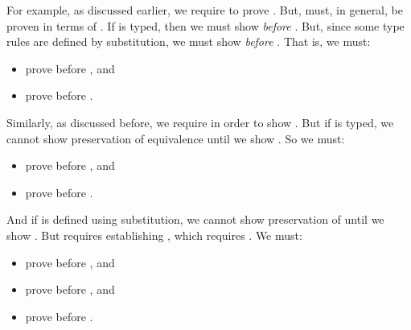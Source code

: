 For example, as discussed earlier, we require
 to prove .
But,  must, in general, be proven in terms of
.
If  is typed, then we must show \emph{
before }.
But, since some type rules are defined by substitution, we must show
\emph{ before }.
That is, we must:
\begin{itemize}
  \item prove  before , and
  \item prove  before .
\end{itemize}
Similarly, as discussed before, we require  in
order to show .
But if  is typed, we cannot show preservation of equivalence
until we show .
So we must:
\begin{itemize}
  \item prove  before , and
  \item prove  before .
\end{itemize}
And if  is defined using substitution, we cannot show
preservation of  until we show . But
 requires establishing , which requires
.
We must:
\begin{itemize}
  \item prove  before , and
  \item prove  before , and
  \item prove  before .
\end{itemize}

